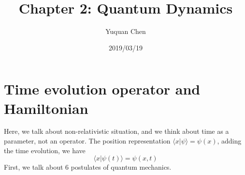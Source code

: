 \documentclass[UTF8,12pt]{article} %
\begin{document}
\title{Chapter 2: Quantum Dynamics}
\author{Yuquan Chen}
\date{2019/03/19} %
\maketitle

\section{Time evolution operator and Hamiltonian}

Here, we talk about non-relativistic situation, and we think about time as a parameter, not an operator. The position representation $\langle x|\psi\rangle = \psi(x)$, adding the time evolution, we have $$\langle x|\psi(t)\rangle = \psi(x,t)$$
First, we talk about 6 postulates of quantum mechanics.\\
\end{document}
